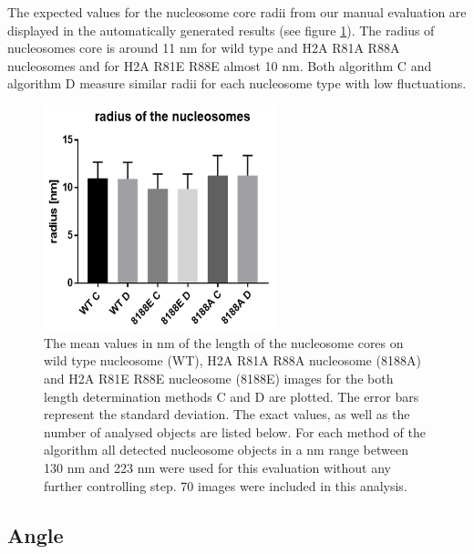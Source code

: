 \documentclass{article}
\begin{document}
The expected values for the nucleosome core radii from our manual evaluation are displayed in the automatically generated results (see figure \ref{fig: radius}). The radius of nucleosomes core is around 11 nm for wild type and H2A R81A R88A nucleosomes and for H2A R81E R88E almost 10 nm. Both algorithm C and algorithm D measure similar radii for each nucleosome type with low fluctuations. 
%
\begin{figure}[!htb]
	\begin{center}
		\includegraphics[width = 0.6\textwidth]{radius}
	\end{center}
	\caption{The mean values in nm of the length of the nucleosome cores on wild type nucleosome (WT), H2A R81A R88A nucleosome (8188A) and H2A R81E R88E nucleosome (8188E) images for the both length determination methods C and D are plotted. The error bars represent the standard deviation. The exact values, as well as the number of analysed objects are listed below. For each method of the algorithm all detected nucleosome objects in a nm range between 130 nm and 223 nm were used for this evaluation without any further controlling step. 70 images were included in this analysis.
	}
	\label{fig: radius} %
\end{figure}

\subsection{Angle}\label{sec: Angle}
\end{document}
